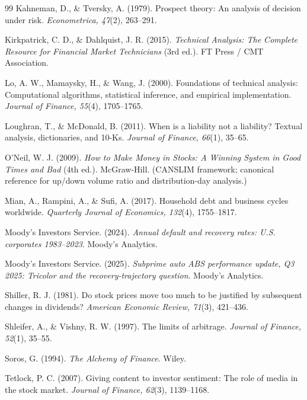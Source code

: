 \documentclass[11pt,a4paper]{article}
\begin{document}
\begin{thebibliography}{99}
Kahneman, D., \& Tversky, A. (1979).
Prospect theory: An analysis of decision under risk.
\textit{Econometrica, 47}(2), 263--291.

Kirkpatrick, C. D., \& Dahlquist, J. R. (2015).
\textit{Technical Analysis: The Complete Resource for Financial Market Technicians} (3rd ed.).
FT Press / CMT Association.

Lo, A. W., Mamaysky, H., \& Wang, J. (2000).
Foundations of technical analysis: Computational algorithms, statistical inference, and empirical implementation.
\textit{Journal of Finance, 55}(4), 1705--1765.

Loughran, T., \& McDonald, B. (2011).
When is a liability not a liability? Textual analysis, dictionaries, and 10-Ks.
\textit{Journal of Finance, 66}(1), 35--65.

O'Neil, W. J. (2009).
\textit{How to Make Money in Stocks: A Winning System in Good Times and Bad} (4th ed.).
McGraw-Hill. (CANSLIM framework; canonical reference for up/down volume ratio and distribution-day analysis.)

Mian, A., Rampini, A., \& Sufi, A. (2017).
Household debt and business cycles worldwide.
\textit{Quarterly Journal of Economics, 132}(4), 1755--1817.

Moody's Investors Service. (2024).
\textit{Annual default and recovery rates: U.S. corporates 1983--2023}.
Moody's Analytics.

Moody's Investors Service. (2025).
\textit{Subprime auto ABS performance update, Q3 2025: Tricolor and the recovery-trajectory question}.
Moody's Analytics.

Shiller, R. J. (1981).
Do stock prices move too much to be justified by subsequent changes in dividends?
\textit{American Economic Review, 71}(3), 421--436.

Shleifer, A., \& Vishny, R. W. (1997).
The limits of arbitrage.
\textit{Journal of Finance, 52}(1), 35--55.

Soros, G. (1994).
\textit{The Alchemy of Finance}.
Wiley.

Tetlock, P. C. (2007).
Giving content to investor sentiment: The role of media in the stock market.
\textit{Journal of Finance, 62}(3), 1139--1168.

\end{thebibliography}
\end{document}

